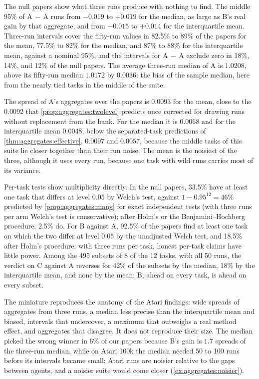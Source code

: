 \begin{refsection}
The null papers show what three runs produce with nothing to find. The middle 95\% of A$\,-\,$A runs from $-0.019$ to $+0.019$ for the median, as large as B's real gain by that aggregate, and from $-0.015$ to $+0.014$ for the interquartile mean. Three-run intervals cover the fifty-run values in 82.5\% to 89\% of the papers for the mean, 77.5\% to 82\% for the median, and 87\% to 88\% for the interquartile mean, against a nominal 95\%, and the intervals for A$\,-\,$A exclude zero in 18\%, 14\%, and 12\% of the null papers. The average three-run median of A is $1.0208$, above its fifty-run median $1.0172$ by $0.0036$: the bias of the sample median, here from the nearly tied tasks in the middle of the suite.

The spread of A's aggregates over the papers is $0.0093$ for the mean, close to the $0.0092$ that \cref{prop:aggregates:twolevel} predicts once corrected for drawing runs without replacement from the bank. For the median it is $0.0068$ and for the interquartile mean $0.0048$, below the separated-task predictions of \cref{thm:aggregates:effective}, $0.0097$ and $0.0057$, because the middle tasks of this suite lie closer together than their run noise. The mean is the noisiest of the three, although it uses every run, because one task with wild runs carries most of its variance.

Per-task tests show multiplicity directly. In the null papers, 33.5\% have at least one task that differs at level $0.05$ by Welch's test, against $1-0.95^{12}=46\%$ predicted by \cref{prop:aggregates:many} for exact independent tests (with three runs per arm Welch's test is conservative); after Holm's or the Benjamini--Hochberg procedure, 2.5\% do. For B against A, 92.5\% of the papers find at least one task on which the two differ at level $0.05$ by the unadjusted Welch test, and 18.5\% after Holm's procedure: with three runs per task, honest per-task claims have little power. Among the 495 subsets of 8 of the 12 tasks, with all 50 runs, the verdict on C against A reverses for 42\% of the subsets by the median, 18\% by the interquartile mean, and none by the mean; B, ahead on every task, is ahead on every subset.

The miniature reproduces the anatomy of the Atari findings: wide spreads of aggregates from three runs, a median less precise than the interquartile mean and biased, intervals that undercover, a maximum that outweighs a real method effect, and aggregates that disagree. It does not reproduce their size. The median picked the wrong winner in 6\% of our papers because B's gain is $1.7$ spreads of the three-run median, while on Atari 100k the median needed 50 to 100 runs before its intervals became small; Atari runs are noisier relative to the gaps between agents, and a noisier suite would come closer (\cref{ex:aggregates:noisier}).


\end{refsection}
